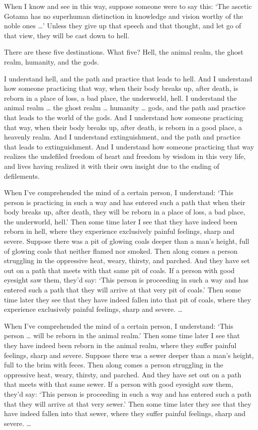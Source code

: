 \documentclass[12pt,openany]{book}%
\begin{document}
When I know and see in this way, suppose someone were to say this: ‘The ascetic Gotama has no superhuman distinction in knowledge and vision worthy of the noble ones …’ Unless they give up that speech and that thought, and let go of that view, they will be cast down to hell. 

There are these five destinations. What five? Hell, the animal realm, the ghost realm, humanity, and the gods. 

I understand hell, and the path and practice that leads to hell. And I understand how someone practicing that way, when their body breaks up, after death, is reborn in a place of loss, a bad place, the underworld, hell. I understand the animal realm … the ghost realm … humanity … gods, and the path and practice that leads to the world of the gods. And I understand how someone practicing that way, when their body breaks up, after death, is reborn in a good place, a heavenly realm. And I understand extinguishment, and the path and practice that leads to extinguishment. And I understand how someone practicing that way realizes the undefiled freedom of heart and freedom by wisdom in this very life, and lives having realized it with their own insight due to the ending of defilements. 

When I’ve comprehended the mind of a certain person, I understand: ‘This person is practicing in such a way and has entered such a path that when their body breaks up, after death, they will be reborn in a place of loss, a bad place, the underworld, hell.’ Then some time later I see that they have indeed been reborn in hell, where they experience exclusively painful feelings, sharp and severe. Suppose there was a pit of glowing coals deeper than a man’s height, full of glowing coals that neither flamed nor smoked. Then along comes a person struggling in the oppressive heat, weary, thirsty, and parched. And they have set out on a path that meets with that same pit of coals. If a person with good eyesight saw them, they’d say: ‘This person is proceeding in such a way and has entered such a path that they will arrive at that very pit of coals.’ Then some time later they see that they have indeed fallen into that pit of coals, where they experience exclusively painful feelings, sharp and severe. … 

When I’ve comprehended the mind of a certain person, I understand: ‘This person … will be reborn in the animal realm.’ Then some time later I see that they have indeed been reborn in the animal realm, where they suffer painful feelings, sharp and severe. Suppose there was a sewer deeper than a man’s height, full to the brim with feces. Then along comes a person struggling in the oppressive heat, weary, thirsty, and parched. And they have set out on a path that meets with that same sewer. If a person with good eyesight saw them, they’d say: ‘This person is proceeding in such a way and has entered such a path that they will arrive at that very sewer.’ Then some time later they see that they have indeed fallen into that sewer, where they suffer painful feelings, sharp and severe. … 
\end{document}
